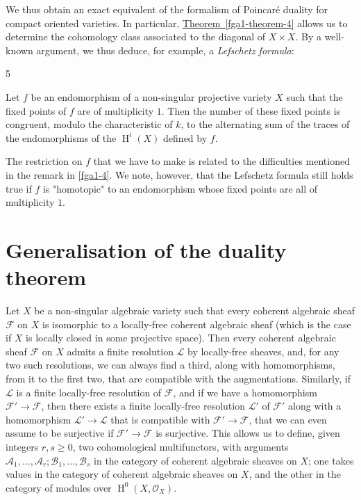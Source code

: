   We thus obtain an exact equivalent of the formalism of Poincaré duality for compact oriented varieties.
  In particular, \hyperref[fga1-theorem-4]{Theorem~\ref*{fga1-theorem-4}} allows us to determine the cohomology class associated to the diagonal of \(X\times  X\).
  By a well-known argument, we thus deduce, for example, a \emph{Lefschetz formula}:\begin{theorem}{5}\label{fga1-theorem-5}\skipsinglepar\par{}Let \(f\) be an endomorphism of a non-singular projective variety \(X\) such that the fixed points of \(f\) are of multiplicity \(1\).
    Then the number of these fixed points is congruent, modulo the characteristic of \(k\), to the alternating sum of the traces of the endomorphisms of the \(\operatorname {H}^i(X)\) defined by \(f\).\end{theorem}\par{}The restriction on \(f\) that we have to make is related to the difficulties mentioned in the remark in \cref{fga1-4}.
  We note, however, that the Lefschetz formula still holds true if \(f\) is "homotopic" to an endomorphism whose fixed points are all of multiplicity \(1\).\chapter{Generalisation of the duality theorem}\thispagestyle{fancy}\label{fga1-8}\par{}Let \(X\) be a non-singular algebraic variety such that every coherent algebraic sheaf \(\mathscr {F}\) on \(X\) is isomorphic to a locally-free coherent algebraic sheaf (which is the case if \(X\) is locally closed in some projective space).
  Then every coherent algebraic sheaf \(\mathscr {F}\) on \(X\) admits a finite resolution \(\mathscr {L}\) by locally-free sheaves, and, for any two such resolutions, we can always find a third, along with homomorphisms, from it to the first two, that are compatible with the augmentations.
  Similarly, if \(\mathscr {L}\) is a finite locally-free resolution of \(\mathscr {F}\), and if we have a homomorphism \(\mathscr {F}'\to \mathscr {F}\), then there exists a finite locally-free resolution \(\mathscr {L}'\) of \(\mathscr {F}'\) along with a homomorphism \(\mathscr {L}'\to \mathscr {L}\) that is compatible with \(\mathscr {F}'\to \mathscr {F}\), that we can even assume to be surjective if \(\mathscr {F}'\to \mathscr {F}\) is surjective.
  This allows us to define, given integers \(r,s\geqslant 0\), two cohomological multifunctors, with arguments \(\mathscr {A}_1,\ldots ,\mathscr {A}_r;\mathscr {B}_1,\ldots ,\mathscr {B}_s\) in the category of coherent algebraic sheaves on \(X\);
  one takes values in the category of coherent algebraic sheaves on \(X\), and the other in the category of modules over \(\operatorname {H}^0(X,\mathcal {O}_X)\).
  
